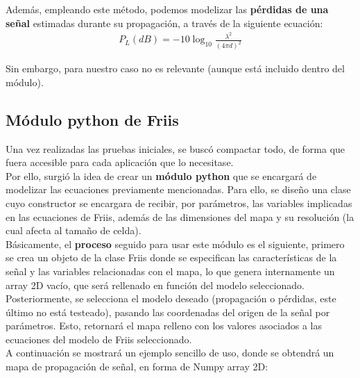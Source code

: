 Además, empleando este método, podemos modelizar las \textbf{pérdidas de una señal} estimadas durante su propagación, a través de la siguiente ecuación:\\

\begin{align}
    P_L(dB) = -10 \log_{10} \frac{\lambda^2}{(4 \pi d)^2} 
\end{align}

Sin embargo, para nuestro caso no es relevante (aunque está incluido dentro del módulo).\\

\subsection{Módulo python de Friis}
\label{subsec:friis-module}

Una vez realizadas las pruebas iniciales, se buscó compactar todo, de forma que fuera accesible para cada aplicación que lo necesitase.\\

Por ello, surgió la idea de crear un \textbf{módulo python} que se encargará de modelizar las ecuaciones previamente mencionadas. Para ello, se diseño una clase cuyo constructor se encargara de recibir, por parámetros, las variables implicadas en las ecuaciones de Friis, además de las dimensiones del mapa y su resolución (la cual afecta al tamaño de celda).\\

Básicamente, el \textbf{proceso} seguido para usar este módulo es el siguiente, primero se crea un objeto de la clase Friis donde se especifican las características de la señal y las variables relacionadas con el mapa, lo que genera internamente un array 2D vacío, que será rellenado en función del modelo seleccionado. Posteriormente, se selecciona el modelo deseado (propagación o pérdidas, este último no está testeado), pasando las coordenadas del origen de la señal por parámetros. Esto, retornará el mapa relleno con los valores asociados a las ecuaciones del modelo de Friis seleccionado.\\

A continuación se mostrará un ejemplo sencillo de uso, donde se obtendrá un mapa de propagación de señal, en forma de Numpy array 2D:

